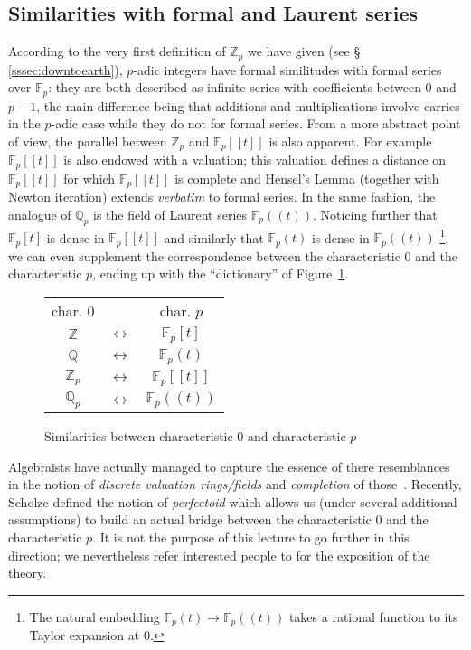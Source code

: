 \documentclass[11pt]{article}
\numberwithin{equation}{section}
\numberwithin{figure}{section}
\theoremstyle{definition}
\newcommand{\Z}{\mathbb Z}
\newcommand{\Zp}{\Z_p}
\newcommand{\Q}{\mathbb Q}
\newcommand{\Qp}{\Q_p}
\newcommand{\F}{\mathbb F}
\newcommand{\Fp}{\F_p}
\begin{document}
\subsection{Similarities with formal and Laurent series}

According to the very first definition of $\Zp$ we have given (see \S 
\ref{sssec:downtoearth}), $p$-adic integers have formal 
similitudes with formal series over $\Fp$: they are both described as
infinite series with coefficients between $0$ and $p{-}1$, the main
difference being that additions and multiplications involve carries
in the $p$-adic case while they do not for formal series. 
From a more abstract point of view, the parallel between $\Zp$ and 
$\Fp[\![t]\!]$ is also apparent. For example $\Fp [\![t]\!]$ is also 
endowed with a valuation; this valuation defines a distance on 
$\Fp[\![t]\!]$ for which $\Fp[\![t]\!]$ is complete and Hensel's Lemma 
(together with Newton iteration) extends \emph{verbatim} to formal 
series. In the same fashion, the analogue of $\Qp$ is the field of 
Laurent series $\Fp(\!(t)\!)$. Noticing further that $\Fp[t]$ is dense 
in $\Fp[\![t]\!]$ and similarly that $\Fp(t)$ is dense in $\Fp(\!(t)\!)$ 
\footnote{The natural embedding $\Fp(t) \to \Fp(\!(t)\!)$ takes a 
rational function to its Taylor expansion at $0$.}, we can even 
supplement the correspondence between the characteristic $0$ and the 
characteristic $p$, ending up with the ``dictionary'' of 
Figure~\ref{fig:char0p}.

\begin{figure}
\hfill
\begin{tabular}{ccc}
char. $0$ & & char. $p$ \smallskip \\
$\Z$ & $\longleftrightarrow$ & $\Fp[t]$ \\
$\Q$ & $\longleftrightarrow$ & $\Fp(t)$ \\
$\Z_p$ & $\longleftrightarrow$ & $\Fp[\![t]\!]$ \\
$\Q_p$ & $\longleftrightarrow$ & $\Fp(\!(t)\!)$ 
\end{tabular}
\hfill\null

\caption{Similarities between characteristic $0$ and characteristic $p$}
\label{fig:char0p}
\end{figure}

Algebraists have actually managed to capture the essence of there 
resemblances in the notion of \emph{discrete valuation rings/fields} and 
\emph{completion} of those~\cite{Se62}. Recently, Scholze defined the 
notion of \emph{perfectoid} which allows us (under several additional 
assumptions) to build an actual bridge between the characteristic $0$ 
and the characteristic $p$. It is not the purpose of this lecture to go 
further in this direction; we nevertheless refer interested people to 
\cite{Sc12,Sc14,Bh14} for the exposition of the theory.
\end{document}
